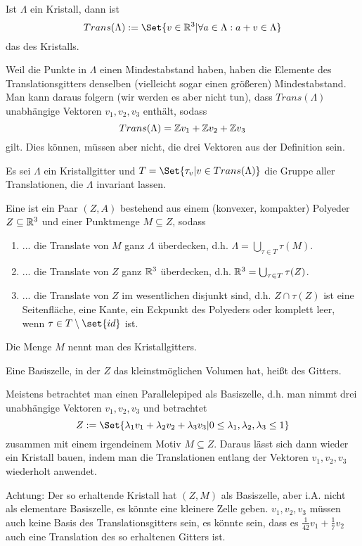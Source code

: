 \begin{definition}
Ist $\Lambda$ ein Kristall, dann ist
\[Trans(\Lambda) := \Set{v\in\IR^3 | \forall a\in\Lambda: a+v\in\Lambda}\]
das  des Kristalls.
\end{definition}

\begin{remark}
Weil die Punkte in $\Lambda$ einen Mindestabstand haben, haben die Elemente des Translationsgitters denselben (vielleicht sogar einen größeren) Mindestabstand. Man kann daraus folgern (wir werden es aber nicht tun), dass $Trans(\Lambda)$ unabhängige Vektoren $v_1,v_2,v_3$ enthält, sodass
\[Trans(\Lambda) = \mathbb{Z} v_1+\mathbb{Z} v_2+\mathbb{Z} v_3\]
gilt. Dies können, müssen aber nicht, die drei Vektoren aus der Definition sein.
\end{remark}

\begin{definition}
Es sei $\Lambda$ ein Kristallgitter und $T=\Set{\tau_v | v\in Trans(\Lambda)}$ die Gruppe aller Translationen, die $\Lambda$ invariant lassen.

Eine  ist ein Paar $(Z,A)$ bestehend aus einem (konvexer, kompakter) Polyeder $Z\subseteq\mathbb{R}^3$ und einer Punktmenge $M\subseteq Z$, sodass
\begin{enumerate}
\item ... die Translate von $M$ ganz $\Lambda$ überdecken, d.h. $\Lambda=\bigcup_{\tau\in T} \tau(M)$.
\item ... die Translate von $Z$ ganz $\mathbb{R}^3$ überdecken, d.h. $\mathbb{R}^3 = \bigcup_{\tau\in T} \tau(Z)$.
\item ... die Translate von $Z$ im wesentlichen disjunkt sind, d.h. $Z \cap \tau(Z)$ ist eine Seitenfläche, eine Kante, ein Eckpunkt des Polyeders oder komplett leer, wenn $\tau\in T\setminus\set{id}$ ist.
\end{enumerate}
Die Menge $M$ nennt man  des Kristallgitters.

Eine Basiszelle, in der $Z$ das kleinstmöglichen Volumen hat, heißt  des Gitters.
\end{definition}

\begin{remark}
Meistens betrachtet man einen Parallelepiped als Basiszelle, d.h. man nimmt drei unabhängige Vektoren $v_1,v_2,v_3$ und betrachtet
\[Z:=\Set{\lambda_1v_1+\lambda_2v_2+\lambda_3v_3 | 0\leq\lambda_1,\lambda_2,\lambda_3\leq 1}\]
zusammen mit einem irgendeinem Motiv $M\subseteq Z$. Daraus lässt sich dann wieder ein Kristall bauen, indem man die Translationen entlang der Vektoren $v_1,v_2,v_3$ wiederholt anwendet.

Achtung: Der so erhaltende Kristall hat $(Z,M)$ als Basiszelle, aber i.A. nicht als elementare Basiszelle, es könnte eine kleinere Zelle geben. $v_1,v_2,v_3$ müssen auch keine Basis des Translationsgitters sein, es könnte sein, dass es $\frac{1}{42}v_1+\frac{1}{7}v_2$ auch eine Translation des so erhaltenen Gitters ist.
\end{remark}
